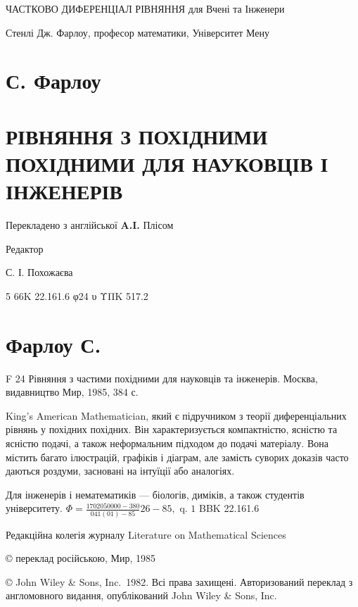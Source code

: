 \documentclass[
  ukrainian,
]{article}
\author{}
\date{}
\begin{document}
ЧАСТКОВО ДИФЕРЕНЦІАЛ РІВНЯННЯ для Вчені та Інженери

Стенлі Дж. Фарлоу, професор математики, Університет Мену

\section{С. Фарлоу}\label{ux441.-ux444ux430ux440ux43bux43eux443}

\section{РІВНЯННЯ З ПОХІДНИМИ ПОХІДНИМИ ДЛЯ НАУКОВЦІВ І
ІНЖЕНЕРІВ}\label{ux440ux456ux432ux43dux44fux43dux43dux44f-ux437-ux43fux43eux445ux456ux434ux43dux438ux43cux438-ux43fux43eux445ux456ux434ux43dux438ux43cux438-ux434ux43bux44f-ux43dux430ux443ux43aux43eux432ux446ux456ux432-ux456-ux456ux43dux436ux435ux43dux435ux440ux456ux432}

Перекладено з англійської \textbf{A.I.} Плісом

Редактор

С. І. Похожаєва

5\textbar{} 66K 22.161.6 φ24 υ ΥΠΚ 517.2

\section{Фарлоу С.}\label{ux444ux430ux440ux43bux43eux443-ux441.}

F 24 Рівняння з частими похідними для науковців та інженерів. Москва,
видавництво Мир, 1985, 384 с.

King's American Mathematician, який є підручником з теорії
диференціальних рівнянь у похідних похідних. Він характеризується
компактністю, ясністю та ясністю подачі, а також неформальним підходом
до подачі матеріалу. Вона містить багато ілюстрацій, графіків і діаграм,
але замість суворих доказів часто даються роздуми, засновані на інтуїції
або аналогіях.

Для інженерів і нематематиків --- біологів, диміків, а також студентів
університету.
\(\Phi = \frac{1702050000-380}{041(01)-85} 26-85, \text{ q. 1}\) BBK
22.161.6

Редакційна колегія журналу Literature on Mathematical Sciences

© переклад російською, Мир, 1985

© John Wiley \& Sons, Inc.~1982. Всі права захищені. Авторизований
переклад з англомовного видання, опублікований John Wiley \& Sons, Inc.
\end{document}
